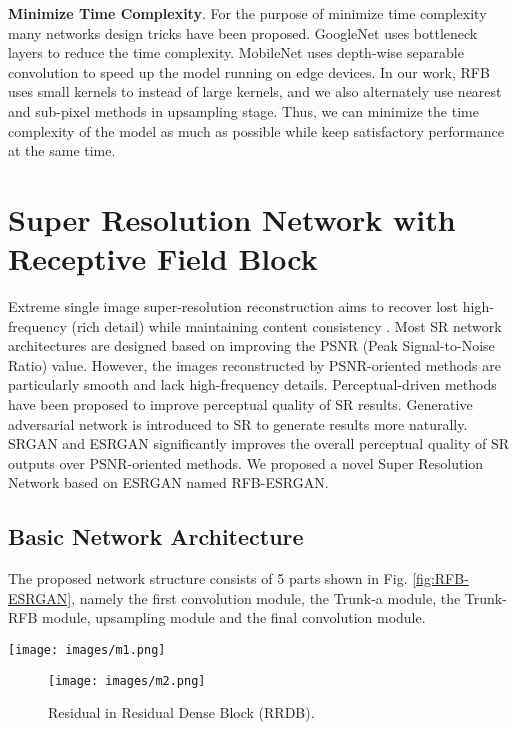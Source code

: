 \documentclass[10pt,twocolumn,letterpaper]{article}
\begin{document}
\textbf{Minimize Time Complexity}. For the purpose of minimize time complexity many networks design tricks have been proposed. GoogleNet \cite{szegedy2015going} uses bottleneck layers to reduce the time complexity. MobileNet \cite{howard2017mobilenets} uses depth-wise separable convolution to speed up the model running on edge devices. In our work, RFB uses small kernels to instead of large kernels, and we also alternately use nearest and sub-pixel methods in upsampling stage. Thus, we can minimize the time complexity of the model as much as possible while keep satisfactory performance at the same time.

\section{Super Resolution Network with Receptive Field Block}
Extreme single image super-resolution reconstruction aims to recover lost high-frequency (rich detail) while maintaining content consistency \cite{gu2019aim}. Most SR network architectures are designed based on improving the PSNR (Peak Signal-to-Noise Ratio) value. However, the images reconstructed by PSNR-oriented methods are particularly smooth and lack high-frequency details. Perceptual-driven methods have been proposed to improve perceptual quality of SR results. Generative adversarial network \cite{goodfellow2014generative} is introduced to SR to generate results more naturally. SRGAN \cite{ledig2017photo} and ESRGAN \cite{wang2018esrgan} significantly improves the overall perceptual quality of SR outputs over PSNR-oriented methods. We proposed a novel Super Resolution Network based on ESRGAN named RFB-ESRGAN. 


\subsection{Basic Network Architecture}
The proposed network structure consists of 5 parts shown in Fig. \ref{fig:RFB-ESRGAN}, namely the first convolution module, the Trunk-a module, the Trunk-RFB module, upsampling module and the final convolution module.

\begin{figure*}[htbp]
\centering 
\texttt{[image: images/m1.png]}
\caption{The structure of RFB-ESRGAN.}
\label{fig:RFB-ESRGAN}
\end{figure*}

\begin{figure}[htbp]
\centering 
\texttt{[image: images/m2.png]}
\caption{Residual in Residual Dense Block (RRDB).}
\label{fig:RRDB}
\end{figure}
\end{document}
